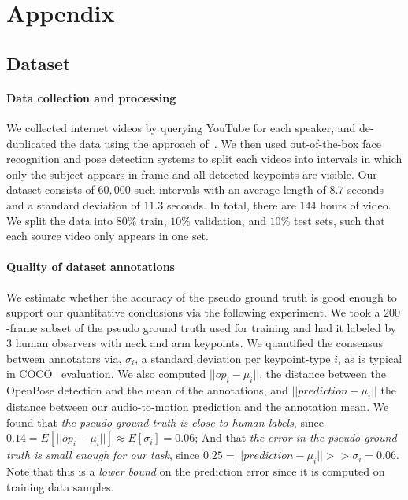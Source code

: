 \documentclass[10pt,twocolumn,letterpaper]{article}
\newcommand{\mypar}[1]{\vspace{-2mm}\paragraph{#1}}
\begin{document}
{\small


}

\section{Appendix}
\subsection{Dataset}
\paragraph{Data collection and processing}  We collected internet videos by querying YouTube for each speaker, and de-duplicated the data using the approach of~\cite{fouhey2017lifestyle}. We then used out-of-the-box face recognition and pose detection systems to split each videos into intervals in which only the subject appears in frame and all detected keypoints are visible. Our dataset consists of $60{,}000$ such intervals with an average length of $8.7$ seconds and a standard deviation of $11.3$ seconds. In total, there are $144$ hours of video. We split the data into $80\%$ train, $10\%$ validation, and $10\%$ test sets, such that each source video only appears in one set.

\mypar{Quality of dataset annotations} We estimate whether the accuracy of the pseudo ground truth is good enough to support our quantitative conclusions via the following experiment.
We took a $200$-frame subset of the pseudo ground truth used for training and had it labeled by $3$ human observers with neck and arm keypoints. We quantified the consensus between annotators via, $\sigma_i$, a standard deviation per keypoint-type $i$, as is typical in COCO~\cite{coco} evaluation. We also computed $||op_i - \mu_i||$, the distance between the OpenPose detection and the mean of the annotations, and $||prediction - \mu_i||$ the distance between our audio-to-motion prediction and the annotation mean. We found that \emph{the pseudo ground truth is close to human labels}, since $0.14 = E[||op_i - \mu_i||] \approx E[\sigma_i] = 0.06$; And that \emph{the error in the pseudo ground truth is small enough for our task}, since $ 0.25 = ||prediction - \mu_i|| >> \sigma_i = 0.06$. Note that this is a \emph{lower bound} on the prediction error since it is computed on training data samples.
\end{document}
